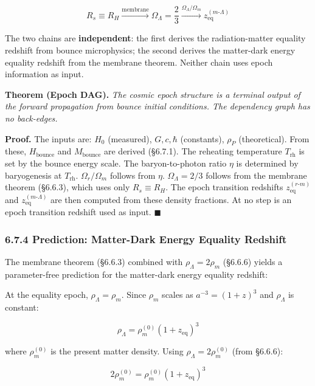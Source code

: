 \documentclass[11pt,a4paper]{article}
\theoremstyle{definition}
\theoremstyle{remark}
\begin{document}
\begin{equation}
\boxed{R_s \equiv R_H \xrightarrow{\text{membrane}} \Omega_\Lambda = \frac{2}{3} \xrightarrow{\Omega_\Lambda/\Omega_m} z_{\text{eq}}^{(m\text{-}\Lambda)}}
\end{equation}


The two chains are \textbf{independent}: the first derives the radiation-matter equality redshift from bounce microphysics; the second derives the matter-dark energy equality redshift from the membrane theorem. Neither chain uses epoch information as input.

\textbf{Theorem (Epoch DAG).} \textit{The cosmic epoch structure is a terminal output of the forward propagation from bounce initial conditions. The dependency graph has no back-edges.}

\textbf{Proof.} The inputs are: $H_0$ (measured), $G, c, \hbar$ (constants), $\rho_P$ (theoretical). From these, $H_{\text{bounce}}$ and $M_{\text{bounce}}$ are derived (\S 6.7.1). The reheating temperature $T_{\text{rh}}$ is set by the bounce energy scale. The baryon-to-photon ratio $\eta$ is determined by baryogenesis at $T_{\text{rh}}$. $\Omega_r/\Omega_m$ follows from $\eta$. $\Omega_\Lambda = 2/3$ follows from the membrane theorem (\S 6.6.3), which uses only $R_s \equiv R_H$. The epoch transition redshifts $z_{\text{eq}}^{(r\text{-}m)}$ and $z_{\text{eq}}^{(m\text{-}\Lambda)}$ are then computed from these density fractions. At no step is an epoch transition redshift used as input. $\blacksquare$

\subsubsection{6.7.4 Prediction: Matter-Dark Energy Equality Redshift}

The membrane theorem (\S 6.6.3) combined with $\rho_\Lambda = 2\rho_m$ (\S 6.6.6) yields a parameter-free prediction for the matter-dark energy equality redshift:

At the equality epoch, $\rho_\Lambda = \rho_m$. Since $\rho_m$ scales as $a^{-3} = (1+z)^3$ and $\rho_\Lambda$ is constant:


\begin{equation}
\rho_\Lambda = \rho_m^{(0)} (1 + z_{\text{eq}})^3
\end{equation}


where $\rho_m^{(0)}$ is the present matter density. Using $\rho_\Lambda = 2 \rho_m^{(0)}$ (from \S 6.6.6):


\begin{equation}
2\rho_m^{(0)} = \rho_m^{(0)} (1 + z_{\text{eq}})^3
\end{equation}
\end{document}
